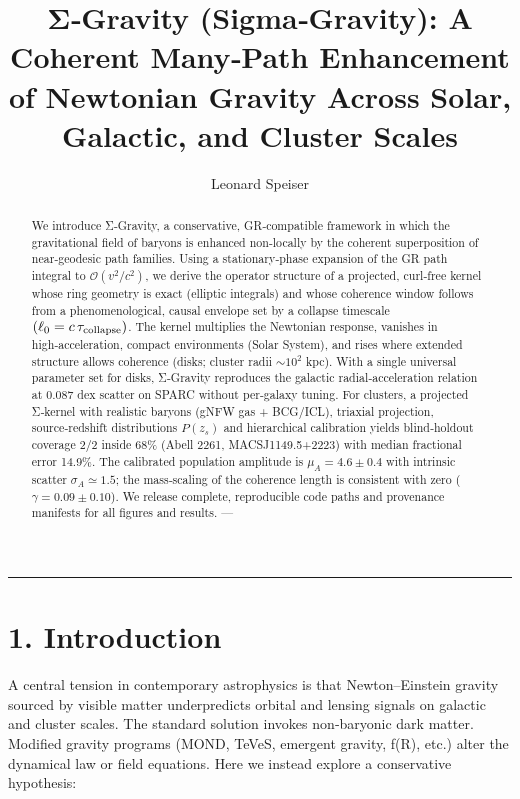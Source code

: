 \documentclass[11pt,a4paper]{article}
\begin{document}
\title{Σ‑Gravity (Sigma‑Gravity): A Coherent Many‑Path Enhancement of Newtonian Gravity Across Solar, Galactic, and Cluster Scales}

\author{Leonard Speiser}

\date{}

\maketitle

\medskip\hrule\medskip


\begin{abstract}
We introduce Σ‑Gravity, a conservative, GR‑compatible framework in which the gravitational field of baryons is enhanced non‑locally by the coherent superposition of near‑geodesic path families. Using a stationary‑phase expansion of the GR path integral to $\mathcal{O}(v^2/c^2)$, we derive the operator structure of a projected, curl‑free kernel whose ring geometry is exact (elliptic integrals) and whose coherence window follows from a phenomenological, causal envelope set by a collapse timescale $(\ell_0 = c\,\tau_{\rm collapse})$. The kernel multiplies the Newtonian response, vanishes in high‑acceleration, compact environments (Solar System), and rises where extended structure allows coherence (disks; cluster radii $\sim 10^2$ kpc).
With a single universal parameter set for disks, Σ‑Gravity reproduces the galactic radial‑acceleration relation at 0.087 dex scatter on SPARC without per‑galaxy tuning. For clusters, a projected Σ‑kernel with realistic baryons (gNFW gas + BCG/ICL), triaxial projection, source‑redshift distributions $P(z_s)$ and hierarchical calibration yields blind‑holdout coverage 2/2 inside 68\% (Abell 2261, MACSJ1149.5+2223) with median fractional error 14.9\%. The calibrated population amplitude is $\mu_A=4.6\pm 0.4$ with intrinsic scatter $\sigma_A\simeq 1.5$; the mass‑scaling of the coherence length is consistent with zero ($\gamma=0.09\pm 0.10$). We release complete, reproducible code paths and provenance manifests for all figures and results.
---
\end{abstract}

\section{1. Introduction}


A central tension in contemporary astrophysics is that Newton–Einstein gravity sourced by visible matter underpredicts orbital and lensing signals on galactic and cluster scales. The standard solution invokes non‑baryonic dark matter. Modified gravity programs (MOND, TeVeS, emergent gravity, f(R), etc.) alter the dynamical law or field equations. Here we instead explore a conservative hypothesis:
\end{document}
